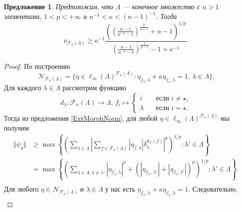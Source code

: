 \documentclass[12pt]{article}
\newtheorem{proposition}[theorem]{Предложение}
\begin{document}
\begin{proposition}\label{ExtMorphsNormLwrBnd}
    Предположим, что $\Lambda$ --- конечное множество с $n > 1$ 
    элементами, $1 < p < +\infty$ и $n^{-1} < \kappa < (n-1)^{-1}$. Тогда
    \[
        \nu_{\mathcal{F}_{\kappa}(\Lambda)}
        \geq 
        \kappa^{-1}\frac{
            \left(
                \left(\frac{n-1}{\kappa^{-1}-1}\right)^{\frac{p}{p-1}}+n-1
            \right)^{1/p}
        }{
            \left(\frac{n-1}{\kappa^{-1}-1}\right)^{\frac{1}{p-1}}-1+\kappa^{-1}
        }.
    \]
\end{proposition}
\begin{proof}
    По построению
    \[
        \mathcal{N}_{\mathcal{F}_{\kappa}(\Lambda)}=\{
            \eta\in\ell_\infty(\Lambda)^{\mathcal{F}_{\kappa}(\Lambda)}:
            \eta_{f_\lambda,\lambda}+\kappa \eta_{f_\star, \lambda}=1,\, 
            \lambda\in\Lambda
        \}.
    \]
    Для каждого $\lambda\in\Lambda$ рассмотрим функцию
    \[
        d_\lambda:\mathcal{F}_\kappa(\Lambda)\to\Lambda,\,
        f_i\mapsto
        \begin{cases}
            i\quad &\text{если } i\neq \star,\\
            \lambda\quad &\text{если } i=\star.
        \end{cases}
    \]
    Тогда из предложения \ref{ExtMorphNorm}, для 
    любой $\eta\in\ell_\infty(\Lambda)^{\mathcal{F}_{\kappa}(\Lambda)}$ мы 
    получим
    \[
    \begin{aligned}
        \Vert\psi_{\eta}\Vert
        &\geq\max\left\{
            \left(\sum_{\lambda\in\Lambda}
                \left|
                    \sum_{f\in\mathcal{F}_{\kappa}(\Lambda)} 
                        |\eta_{f,\lambda}|\delta_{\lambda}^{d_{\lambda'}(f)}
                \right|^p
            \right)^{1/p}:
            \lambda'\in\Lambda
        \right\} \\
        &=\max\left\{
            \left(
                \sum_{\lambda\in\Lambda,\lambda\neq \lambda'} 
                    |\eta_{f_\lambda,\lambda}|^p+
                    (|\eta_{f_{\lambda'},\lambda'}|+|\eta_{f_\star,\lambda'}|)^p
            \right)^{1/p}:
            \lambda'\in\Lambda
        \right\}. \\
    \end{aligned}
    \]
    Для любого $\eta\in\mathcal{N}_{\mathcal{F}_{\kappa}(\Lambda)}$ 
    и $\lambda\in\Lambda$ у нас 
    есть $\eta_{f_\lambda,\lambda}+\kappa \eta_{f_\star, \lambda}=1$. 
    Следовательно,
    \[
    \begin{aligned}

\end{aligned}\]
\end{proof}
\end{document}
